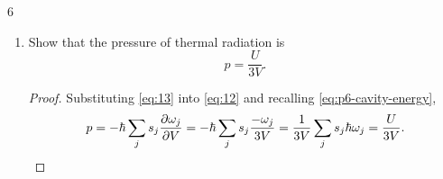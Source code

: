 \documentclass[11pt]{article}
\begin{document}
\begin{problem}{6}
\begin{enumerate}[label=(\alph*)]
  \item Show that the pressure of thermal radiation is
  \begin{equation}
    \label{eq:p6-radiation-pressure}
    p = \frac{U}{3V}.
  \end{equation}
        \begin{proof}
          Substituting \cref{eq:13} into \cref{eq:12} and recalling \cref{eq:p6-cavity-energy},
          \begin{equation}
          \label{eq:14}
          p = -\hbar \sum\limits_{j} s_j \pdv{\omega_j}{V} = -\hbar \sum\limits_j s_j \frac{-\omega_j}{3V} = \frac{1}{3V} \sum\limits_{j} s_{j}\hbar\omega_{j} = \frac{U}{3V}.
          \end{equation}
        \end{proof}
\end{enumerate}
\end{problem}
\end{document}
